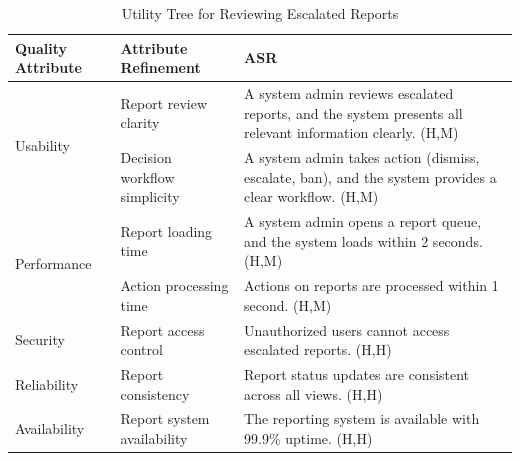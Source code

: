 \documentclass{article}
\begin{document}
\begin{table}[H]
    \centering
    \caption{Utility Tree for Reviewing Escalated Reports}
    \begin{tabular}{|p{3cm}|p{4cm}|p{7cm}|}
        \hline
        \textbf{Quality Attribute} & \textbf{Attribute Refinement}                                                                             & \textbf{ASR} \\
        \hline

        \multirow{2}{*}{Usability}
                                   & Report review clarity
                                   & A system admin reviews escalated reports, and the system presents all relevant information clearly. (H,M)                \\
        \cline{2-3}
                                   & Decision workflow simplicity
                                   & A system admin takes action (dismiss, escalate, ban), and the system provides a clear workflow. (H,M)                    \\
        \hline

        \multirow{2}{*}{Performance}
                                   & Report loading time
                                   & A system admin opens a report queue, and the system loads within 2 seconds. (H,M)                                        \\
        \cline{2-3}
                                   & Action processing time
                                   & Actions on reports are processed within 1 second. (H,M)                                                                  \\
        \hline

        Security
                                   & Report access control
                                   & Unauthorized users cannot access escalated reports. (H,H)                                                                \\
        \hline

        Reliability
                                   & Report consistency
                                   & Report status updates are consistent across all views. (H,H)                                                             \\
        \hline

        Availability
                                   & Report system availability
                                   & The reporting system is available with 99.9\% uptime. (H,H)                                                              \\
        \hline


\end{tabular}
\end{table}
\end{document}
